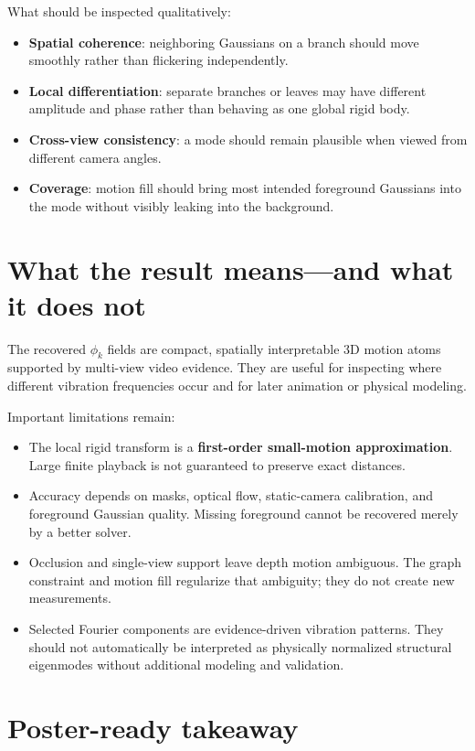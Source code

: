 \documentclass[10pt]{article}
\begin{document}
What should be inspected qualitatively:

\begin{itemize}
  \item \textbf{Spatial coherence}: neighboring Gaussians on a branch should
  move smoothly rather than flickering independently.
  \item \textbf{Local differentiation}: separate branches or leaves may have
  different amplitude and phase rather than behaving as one global rigid body.
  \item \textbf{Cross-view consistency}: a mode should remain plausible when
  viewed from different camera angles.
  \item \textbf{Coverage}: motion fill should bring most intended foreground
  Gaussians into the mode without visibly leaking into the background.
\end{itemize}

\section{What the result means---and what it does not}

The recovered $\phi_k$ fields are compact, spatially interpretable 3D motion
atoms supported by multi-view video evidence. They are useful for inspecting
where different vibration frequencies occur and for later animation or
physical modeling.

Important limitations remain:

\begin{itemize}
  \item The local rigid transform is a \textbf{first-order small-motion
  approximation}. Large finite playback is not guaranteed to preserve exact
  distances.
  \item Accuracy depends on masks, optical flow, static-camera calibration, and
  foreground Gaussian quality. Missing foreground cannot be recovered merely
  by a better solver.
  \item Occlusion and single-view support leave depth motion ambiguous. The
  graph constraint and motion fill regularize that ambiguity; they do not
  create new measurements.
  \item Selected Fourier components are evidence-driven vibration patterns.
  They should not automatically be interpreted as physically normalized
  structural eigenmodes without additional modeling and validation.
\end{itemize}

\section{Poster-ready takeaway}
\end{document}

